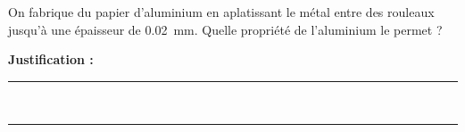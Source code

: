 On fabrique du papier d'aluminium en aplatissant le métal entre des rouleaux jusqu'à une épaisseur de \qty{0.02}{mm}. Quelle propriété de l'aluminium le permet ?

\choices

\noindent\textbf{Justification :} \hrulefill \\[2.5ex]
\rule{\linewidth}{0.4pt} \\[2.5ex]
\rule{\linewidth}{0.4pt}
\vfill
